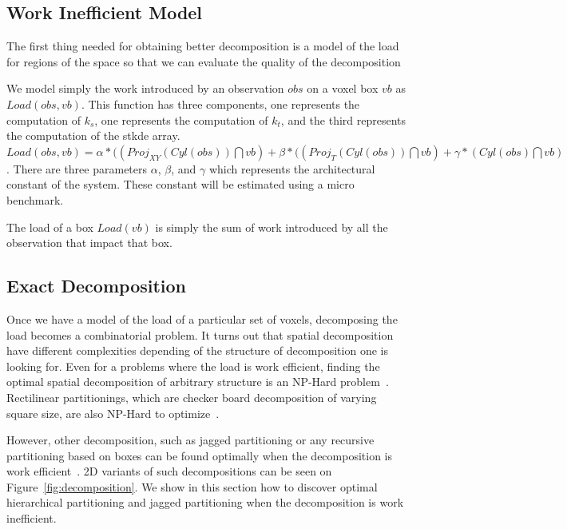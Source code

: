 \documentclass{article}
\begin{document}
\subsection{Work Inefficient Model}

\label{sec:workmodel}

The first thing needed for obtaining better decomposition is a model
of the load for regions of the space so that we can evaluate the
quality of the decomposition

We model simply the work introduced by an observation $obs$ on a voxel
box $vb$ as $Load(obs, vb)$. This function has three components, one
represents the computation of $k_s$, one represents the computation of
$k_t$, and the third represents the computation of the stkde
array. $Load(obs, vb) = \alpha * ((Proj_{XY}(Cyl(obs)) \bigcap vb) +
\beta * ((Proj_{T}(Cyl(obs)) \bigcap vb) + \gamma * (Cyl(obs) \bigcap
vb)$. There are three parameters $\alpha$, $\beta$, and $\gamma$ which
represents the architectural constant of the system. These constant
will be estimated using a micro benchmark.

The load of a box $Load(vb)$ is simply the sum of work introduced by
all the observation that impact that box.

    
\subsection{Exact Decomposition}
\label{sec:exactdecomposition}

Once we have a model of the load of a particular set of voxels,
decomposing the load becomes a combinatorial problem. It turns out
that spatial decomposition have different complexities depending of
the structure of decomposition one is looking for. Even for a problems
where the load is work efficient, finding the optimal spatial
decomposition of arbitrary structure is an NP-Hard
problem~\cite{grigni96}. Rectilinear partitionings, which are checker board
decomposition of varying square size, are also NP-Hard to optimize~\cite{grigni96,aspvall98}.

However, other decomposition, such as jagged partitioning or any
recursive partitioning based on boxes can be found optimally when the
decomposition is work efficient~\cite{saule12-jpdc-spart}. 2D variants of such
decompositions can be seen on Figure~\ref{fig:decomposition}. We show in this section
how to discover optimal hierarchical partitioning and jagged
partitioning when the decomposition is work inefficient.
\end{document}
